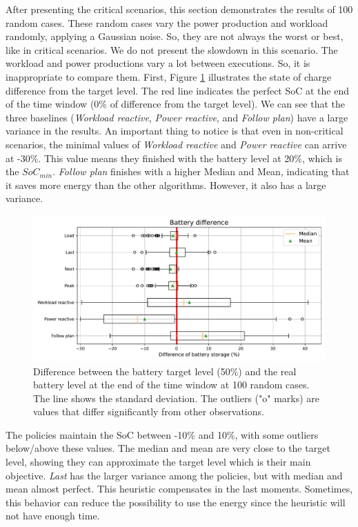 After presenting the critical scenarios, this section demonstrates the results of 100 random cases. These random cases vary the power production and workload randomly, applying a Gaussian noise. So, they are not always the worst or best, like in critical scenarios. We do not present the slowdown in this scenario. The workload and power productions vary a lot between executions. So, it is inappropriate to compare them. First, Figure \ref{fig:SoC_diff} illustrates the state of charge difference from the target level. The red line indicates the perfect SoC at the end of the time window (0\% of difference from the target level). We can see that the three baselines (\emph{Workload reactive}, \emph{Power reactive}, and \emph{Follow plan}) have a large variance in the results. An important thing to notice is that even in non-critical scenarios, the minimal values of \emph{Workload reactive} and \emph{Power reactive} can arrive at -30\%. This value means they finished with the battery level at 20\%, which is the $SoC_{min}$. \emph{Follow plan} finishes with a higher Median and Mean, indicating that it saves more energy than the other algorithms. However, it also has a large variance.

\begin{figure}[!htb]
    \centering
    \includegraphics[scale=0.55]{Images/Compensations/battery_diff.pdf}
    \caption[Difference between the battery target level (50\%) and the real battery level at the end of the time window at 100 random cases.]{Difference between the battery target level (50\%) and the real battery level at the end of the time window at 100 random cases. The line shows the standard deviation. The outliers ("o" marks) are values that differ significantly from other observations.}
    \label{fig:SoC_diff}
\end{figure}

The policies maintain the SoC between -10\% and 10\%, with some outliers below/above these values. The median and mean are very close to the target level, showing they can approximate the target level which is their main objective. \emph{Last} has the larger variance among the policies, but with median and mean almost perfect. This heuristic compensates in the last moments. Sometimes, this behavior can reduce the possibility to use the energy since the heuristic will not have enough time. 

